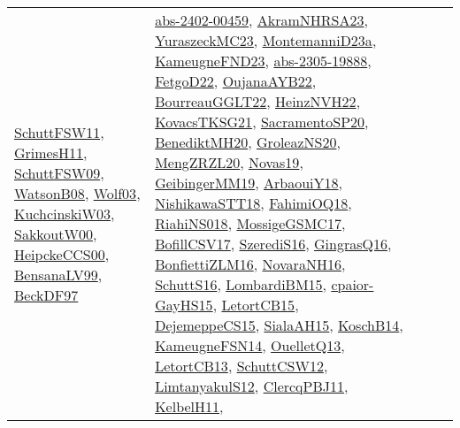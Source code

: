 {\begin{longtable}{lp{3cm}>{\raggedright}p{6cm}>{\raggedright}p{6cm}p{8cm}}
\href{articles/SchuttFSW11.pdf}{SchuttFSW11}\cite{SchuttFSW11}, \href{papers/GrimesH11.pdf}{GrimesH11}\cite{GrimesH11}, \href{papers/SchuttFSW09.pdf}{SchuttFSW09}\cite{SchuttFSW09}, \href{papers/WatsonB08.pdf}{WatsonB08}\cite{WatsonB08}, \href{papers/Wolf03.pdf}{Wolf03}\cite{Wolf03}, \href{articles/KuchcinskiW03.pdf}{KuchcinskiW03}\cite{KuchcinskiW03}, \href{articles/SakkoutW00.pdf}{SakkoutW00}\cite{SakkoutW00}, \href{articles/HeipckeCCS00.pdf}{HeipckeCCS00}\cite{HeipckeCCS00}, \href{articles/BensanaLV99.pdf}{BensanaLV99}\cite{BensanaLV99}, \href{papers/BeckDF97.pdf}{BeckDF97}\cite{BeckDF97} & \href{articles/abs-2402-00459.pdf}{abs-2402-00459}\cite{abs-2402-00459}, \href{articles/AkramNHRSA23.pdf}{AkramNHRSA23}\cite{AkramNHRSA23}, \href{papers/YuraszeckMC23.pdf}{YuraszeckMC23}\cite{YuraszeckMC23}, \href{articles/MontemanniD23a.pdf}{MontemanniD23a}\cite{MontemanniD23a}, \href{papers/KameugneFND23.pdf}{KameugneFND23}\cite{KameugneFND23}, \href{articles/abs-2305-19888.pdf}{abs-2305-19888}\cite{abs-2305-19888}, \href{articles/FetgoD22.pdf}{FetgoD22}\cite{FetgoD22}, \href{papers/OujanaAYB22.pdf}{OujanaAYB22}\cite{OujanaAYB22}, \href{articles/BourreauGGLT22.pdf}{BourreauGGLT22}\cite{BourreauGGLT22}, \href{articles/HeinzNVH22.pdf}{HeinzNVH22}\cite{HeinzNVH22}, \href{papers/KovacsTKSG21.pdf}{KovacsTKSG21}\cite{KovacsTKSG21}, \href{articles/SacramentoSP20.pdf}{SacramentoSP20}\cite{SacramentoSP20}, \href{articles/BenediktMH20.pdf}{BenediktMH20}\cite{BenediktMH20}, \href{papers/GroleazNS20.pdf}{GroleazNS20}\cite{GroleazNS20}, \href{articles/MengZRZL20.pdf}{MengZRZL20}\cite{MengZRZL20}, \href{articles/Novas19.pdf}{Novas19}\cite{Novas19}, \href{papers/GeibingerMM19.pdf}{GeibingerMM19}\cite{GeibingerMM19}, \href{papers/ArbaouiY18.pdf}{ArbaouiY18}\cite{ArbaouiY18}, \href{papers/NishikawaSTT18.pdf}{NishikawaSTT18}\cite{NishikawaSTT18}, \href{articles/FahimiOQ18.pdf}{FahimiOQ18}\cite{FahimiOQ18}, \href{papers/RiahiNS018.pdf}{RiahiNS018}\cite{RiahiNS018}, \href{papers/MossigeGSMC17.pdf}{MossigeGSMC17}\cite{MossigeGSMC17}, \href{papers/BofillCSV17.pdf}{BofillCSV17}\cite{BofillCSV17}, \href{papers/SzerediS16.pdf}{SzerediS16}\cite{SzerediS16}, \href{papers/GingrasQ16.pdf}{GingrasQ16}\cite{GingrasQ16}, \href{papers/BonfiettiZLM16.pdf}{BonfiettiZLM16}\cite{BonfiettiZLM16}, \href{articles/NovaraNH16.pdf}{NovaraNH16}\cite{NovaraNH16}, \href{papers/SchuttS16.pdf}{SchuttS16}\cite{SchuttS16}, \href{papers/LombardiBM15.pdf}{LombardiBM15}\cite{LombardiBM15}, \href{papers/cpaior-GayHS15.pdf}{cpaior-GayHS15}\cite{cpaior-GayHS15}, \href{articles/LetortCB15.pdf}{LetortCB15}\cite{LetortCB15}, \href{papers/DejemeppeCS15.pdf}{DejemeppeCS15}\cite{DejemeppeCS15}, \href{papers/SialaAH15.pdf}{SialaAH15}\cite{SialaAH15}, \href{papers/KoschB14.pdf}{KoschB14}\cite{KoschB14}, \href{articles/KameugneFSN14.pdf}{KameugneFSN14}\cite{KameugneFSN14}, \href{papers/OuelletQ13.pdf}{OuelletQ13}\cite{OuelletQ13}, \href{papers/LetortCB13.pdf}{LetortCB13}\cite{LetortCB13}, \href{papers/SchuttCSW12.pdf}{SchuttCSW12}\cite{SchuttCSW12}, \href{articles/LimtanyakulS12.pdf}{LimtanyakulS12}\cite{LimtanyakulS12}, \href{papers/ClercqPBJ11.pdf}{ClercqPBJ11}\cite{ClercqPBJ11}, \href{articles/KelbelH11.pdf}{KelbelH11}\cite{KelbelH11}, 
\end{longtable}}
